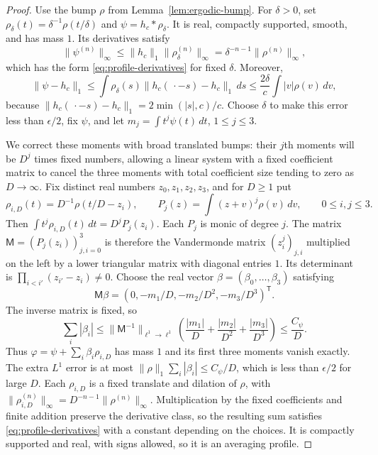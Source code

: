 \begin{proof}
Use the bump \(\rho\) from Lemma~\ref{lem:ergodic-bump}.  For
\(\delta>0\), set \(\rho_\delta(t)=\delta^{-1}\rho(t/\delta)\) and
\(\psi=h_c*\rho_\delta\).  It is real, compactly supported, smooth,
and has mass \(1\).  Its derivatives satisfy
\[
 \|\psi^{(n)}\|_\infty
   \leq\|h_c\|_1\|\rho_\delta^{(n)}\|_\infty
   =\delta^{-n-1}\|\rho^{(n)}\|_\infty,
\]
which has the form \eqref{eq:profile-derivatives} for fixed \(\delta\).
Moreover,
\[
 \|\psi-h_c\|_1
 \leq\int\rho_\delta(s)\|h_c(\,\cdot-s)-h_c\|_1\,ds
 \leq\frac{2\delta}{c}\int|v|\rho(v)\,dv,
\]
because \(\|h_c(\,\cdot-s)-h_c\|_1=2\min(|s|,c)/c\).
Choose \(\delta\) to make this error less than \(\epsilon/2\), fix
\(\psi\), and let \(m_j=\int t^j\psi(t)\,dt\), \(1\leq j\leq3\).

We correct these moments with broad translated bumps: their \(j\)th moments
will be \(D^j\) times fixed numbers, allowing a linear system with a fixed
coefficient matrix to cancel the three moments with total coefficient size
tending to zero as \(D\to\infty\).
Fix distinct real numbers \(z_0,z_1,z_2,z_3\), and for \(D\geq1\) put
\[
 \rho_{i,D}(t)=D^{-1}\rho(t/D-z_i),\qquad
 P_j(z)=\int(z+v)^j\rho(v)\,dv,\qquad 0\leq i,j\leq3.
\]
Then \(\int t^j\rho_{i,D}(t)\,dt=D^jP_j(z_i)\).
Each \(P_j\) is monic of degree \(j\).  The matrix
\(\mathsf M=(P_j(z_i))_{j,i=0}^3\) is therefore the Vandermonde matrix
\((z_i^j)_{j,i}\) multiplied on the left by a lower triangular matrix
with diagonal entries \(1\).  Its determinant is
\(\prod_{i<i'}(z_{i'}-z_i)\neq0\).
Choose the real vector \(\beta=(\beta_0,\ldots,\beta_3)\) satisfying
\[
 \mathsf M\beta=(0,-m_1/D,-m_2/D^2,-m_3/D^3)^{\mathsf T}.
\]
The inverse matrix is fixed, so
\[
 \sum_i|\beta_i|
 \leq\|\mathsf M^{-1}\|_{\ell^1\to\ell^1}
      \left(\frac{|m_1|}{D}+\frac{|m_2|}{D^2}+\frac{|m_3|}{D^3}\right)
 \leq\frac{C_\psi}{D}.
\]
Thus \(\varphi=\psi+\sum_i\beta_i\rho_{i,D}\) has mass \(1\) and its
first three moments vanish exactly.  The extra \(L^1\) error is at most
\(\|\rho\|_1\sum_i|\beta_i|\leq C_\psi/D\), which is less than
\(\epsilon/2\) for large \(D\).  Each \(\rho_{i,D}\) is a fixed translate
and dilation of \(\rho\), with
\(\|\rho_{i,D}^{(n)}\|_\infty=D^{-n-1}\|\rho^{(n)}\|_\infty\).
Multiplication by the fixed coefficients and finite addition preserve
the derivative class, so the resulting sum satisfies
\eqref{eq:profile-derivatives} with a constant depending on the choices.
It is compactly supported and real, with signs allowed, so it is an
averaging profile.
\end{proof}

